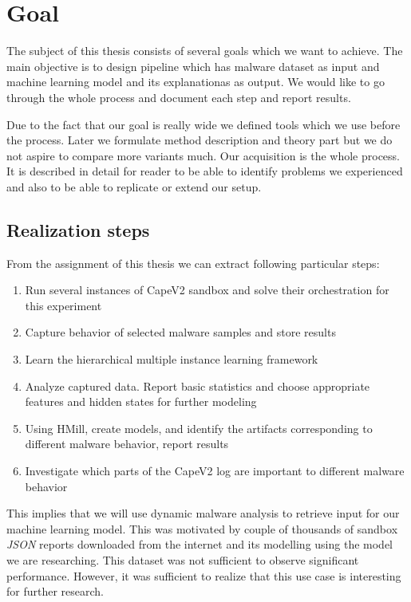 \section{Goal}
The subject of this thesis consists of several goals which we want to achieve. The main objective is to design pipeline which has malware dataset as input and machine learning model and its explanationas as output. We would like to go through the whole process and document each step and report results.

Due to the fact that our goal is really wide we defined tools which we use before the process. Later we formulate method description and theory part but we do not aspire to compare more variants much. Our acquisition is the whole process. It is described in detail for reader to be able to identify problems we experienced and also to be able to replicate or extend our setup.

\subsection{Realization steps}
From the assignment of this thesis we can extract following particular steps:
\begin{enumerate}
    \item Run several instances of CapeV2 \cite{Cape} sandbox and solve their orchestration for this experiment
    \item Capture behavior of selected malware samples and store results
    \item Learn the hierarchical multiple instance learning framework
    \item Analyze captured data. Report basic statistics and choose appropriate features and hidden states for further modeling
    \item Using HMill, create models, and identify the artifacts corresponding to different malware behavior, report results
    \item Investigate which parts of the CapeV2 log are important to different malware behavior
\end{enumerate}

This implies that we will use dynamic malware analysis to retrieve input for our machine learning model. This was motivated by couple of thousands of sandbox \emph{JSON} reports downloaded from the internet and its modelling using the model we are researching. This dataset was not sufficient to observe significant performance. However, it was sufficient to realize that this use case is interesting for further research.

